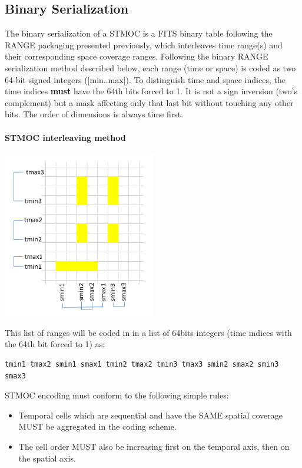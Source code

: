\documentclass[11pt,a4paper]{ivoa}
\begin{document}
\subsection{Binary Serialization}
The binary serialization of a STMOC is a FITS binary table following
the RANGE packaging presented previously, which interleaves time range(s)
and their corresponding space coverage ranges. Following the binary
RANGE serialization method described below, each range (time or space)
is coded as two 64-bit signed integers ([min..max[). To distinguish time
and space indices, the time indices {\bf must} have the 64th bits forced
to 1. It is not a sign inversion (two's complement) but a mask affecting
only that last bit without touching any other bits.  The order of
dimensions is always time first.

\paragraph{STMOC interleaving method}
\begin{adjustbox}{center,caption={STMOC encoding with two independent
      numbering system},
    label={fig:stmocbin-encoding},nofloat=figure,vspace=\bigskipamount}
\includegraphics[width=0.5\textwidth]{STMOCbin.png}
\end{adjustbox}

\par\noindent
This list of ranges will be  coded in in a list of 64bits integers
(time indices with the 64th bit forced to 1) as:
\begin{lstlisting}[]
   tmin1 tmax2 smin1 smax1 tmin2 tmax2 tmin3 tmax3 smin2 smax2 smin3 smax3
\end{lstlisting}

STMOC encoding must conform to the following simple rules:
\begin{itemize}
\item{Temporal cells which are sequential and have the SAME
  spatial coverage MUST be aggregated in the coding scheme.}
\item{The cell order MUST also be increasing first on the
  temporal axis, then on the spatial axis.}
\end{itemize}
\end{document}
